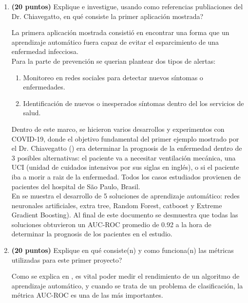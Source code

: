 \documentclass[english]{article}
\begin{document}
\begin{enumerate}
\begin{enumerate}
\item \textbf{(20 puntos)} Explique e investigue, usando como referencias
publiaciones del Dr. Chiavegatto, en qu\'{e} consiste la primer aplicaci\'{o}n
mostrada?

La primera aplicaci\'{o}n mostrada consisti\'{o} en encontrar una forma que un aprendizaje autom\'{a}tico fuera capaz de evitar el esparcimiento de una enfermedad infecciosa.\\

Para la parte de prevenci\'{o}n se querian plantear dos tipos de alertas:
\begin{enumerate}
    \item Monitoreo en redes sociales para detectar nuevos s\'{i}ntomas o enfermedades.
    \item Identificaci\'{o}n de nuevos o inesperados s\'{i}ntomas dentro del los servicios de salud.\\
\end{enumerate}

Dentro de este marco, se hicieron varios desarrollos y experimentos con COVID-19, donde el objetivo fundamental del primer ejemplo mostrado por el Dr. Chiavegatto (\cite{Chiavegatto_COVID}) era determinar la prognosis de la enfermedad dentro de 3 posibles alternativas: el paciente va a necesitar ventilaci\'{o}n mec\'{a}nica, una UCI (unidad de cuidados intensivos por sus siglas en ingl\'{e}s), o si el paciente iba a morir a raiz de la enfermedad. Todos los casos estudiados provienen de pacientes del hospital de S\~{a}o Paulo, Brasil.\\

En \cite{Chiavegatto_COVID} se muestra el desarrollo de 5 soluciones de aprendizaje autom\'{a}tico: redes neuronales artificiales, extra tree, Random Forest, catboost y Extreme Gradient Boosting). Al final de este documento se desmuestra que todas las soluciones obtuvieron un AUC-ROC promedio de 0.92 a la hora de determinar la prognosis de los pacientes en el estudio. \\


\item \textbf{(20 puntos)} Explique en qu\'{e} consiste(n) y como funciona(n)
las m\'{e}tricas utilizadas para este primer proyecto?

Como se explica en \cite{AUCROCWebSite}, es vital poder medir el rendimiento de un algoritmo de aprendizaje autom\'{a}tico, y cuando se trata de un problema de clasificaci\'{o}n, la m\'{e}trica AUC-ROC es una de las m\'{a}s importantes.\\


\end{enumerate}
\end{enumerate}
\end{document}
